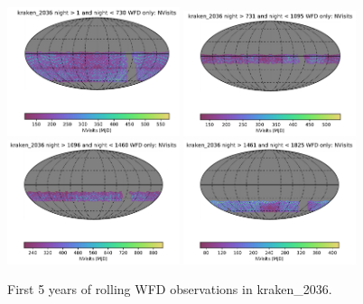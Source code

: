 \documentclass[DM,lsstdraft,authoryear,toc]{lsstdoc}
\begin{document}
\begin{figure}[ht]
\centering
\includegraphics[width=0.45\textwidth]{figures/kraken_2036_NVisits_night_gt_1_and_night_lt_730_WFD_only_HEAL_SkyMap.pdf}
\includegraphics[width=0.45\textwidth]{figures/kraken_2036_NVisits_night_gt_731_and_night_lt_1095_WFD_only_HEAL_SkyMap.pdf} \\
\includegraphics[width=0.45\textwidth]{figures/kraken_2036_NVisits_night_gt_1096_and_night_lt_1460_WFD_only_HEAL_SkyMap.pdf}
\includegraphics[width=0.45\textwidth]{figures/kraken_2036_NVisits_night_gt_1461_and_night_lt_1825_WFD_only_HEAL_SkyMap.pdf}
\caption{First 5 years of rolling WFD observations in  kraken\_2036.}
\label{fig:rolling_nvis-2036}
\end{figure}
\end{document}
